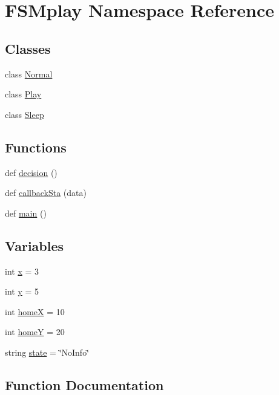 \hypertarget{namespaceFSMplay}{}\section{F\+S\+Mplay Namespace Reference}
\label{namespaceFSMplay}
\subsection*{Classes}
\begin{DoxyCompactItemize}
\item 
class \hyperlink{classFSMplay_1_1Normal}{Normal}
\item 
class \hyperlink{classFSMplay_1_1Play}{Play}
\item 
class \hyperlink{classFSMplay_1_1Sleep}{Sleep}
\end{DoxyCompactItemize}
\subsection*{Functions}
\begin{DoxyCompactItemize}
\item 
def \hyperlink{namespaceFSMplay_af5737f9fd324f828e26e284ac1507c41}{decision} ()
\item 
def \hyperlink{namespaceFSMplay_a3bc95d6992f87d1eff32e90c42afa174}{callback\+Sta} (data)
\item 
def \hyperlink{namespaceFSMplay_adbd365239ac43d3f6db9bf159bdb32aa}{main} ()
\end{DoxyCompactItemize}
\subsection*{Variables}
\begin{DoxyCompactItemize}
\item 
int \hyperlink{namespaceFSMplay_a7d6243201fca91fa69860e496e4c79cc}{x} = 3
\item 
int \hyperlink{namespaceFSMplay_aaa515c5ee548f4f3d3b5f659df68a31e}{y} = 5
\item 
int \hyperlink{namespaceFSMplay_a2f557f770ac04e1b6203cda2160f0cd5}{homeX} = 10
\item 
int \hyperlink{namespaceFSMplay_a1bcd3f45e0cdc70a07b202d7064295eb}{homeY} = 20
\item 
string \hyperlink{namespaceFSMplay_a24209da576b0fb97aa90612ce34275dc}{state} = \char`\"{}No\+Info\char`\"{}
\end{DoxyCompactItemize}


\subsection{Function Documentation}
